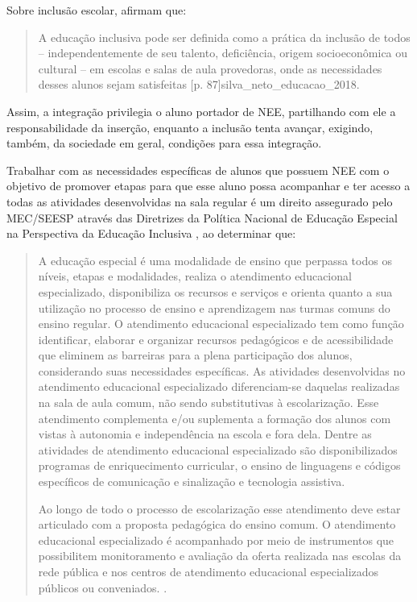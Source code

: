 \documentclass{textolivre}
\begin{document}
Sobre inclusão escolar, \textcite{stainback_inclusao_1999} afirmam que:

\begin{quote}
    A educação inclusiva pode ser definida como a prática da inclusão de todos – independentemente de seu talento, deficiência, origem socioeconômica ou cultural – em escolas e salas de aula provedoras, onde as necessidades desses alunos sejam satisfeitas [p. 87]{silva_neto_educacao_2018}.
\end{quote}

Assim, a integração privilegia o aluno portador de NEE, partilhando com ele a responsabilidade da inserção, enquanto a inclusão tenta avançar, exigindo, também, da sociedade em geral, condições para essa integração. 

Trabalhar com as necessidades específicas de alunos que possuem NEE com o objetivo de promover etapas para que esse aluno possa acompanhar e ter acesso a todas as atividades desenvolvidas na sala regular é um direito assegurado pelo MEC/SEESP através das Diretrizes da Política Nacional de Educação Especial na Perspectiva da Educação Inclusiva \cite{brasil_politica_2008}, ao determinar que:

\begin{quote}
    A educação especial é uma modalidade de ensino que perpassa todos os níveis, etapas e modalidades, realiza o atendimento educacional especializado, disponibiliza os recursos e serviços e orienta quanto a sua utilização no processo de ensino e aprendizagem nas turmas comuns do ensino regular. O atendimento educacional especializado tem como função identificar, elaborar e organizar recursos pedagógicos e de acessibilidade que eliminem as barreiras para a plena participação dos alunos, considerando suas necessidades específicas. As atividades desenvolvidas no atendimento educacional especializado diferenciam-se daquelas realizadas na sala de aula comum, não sendo substitutivas à escolarização. Esse atendimento complementa e/ou suplementa a formação dos alunos com vistas à autonomia e independência na escola e fora dela. Dentre as atividades de atendimento educacional especializado são disponibilizados programas de enriquecimento curricular, o ensino de linguagens e códigos específicos de comunicação e sinalização e tecnologia assistiva.
    
    Ao longo de todo o processo de escolarização esse atendimento deve estar articulado com a proposta pedagógica do ensino comum. O atendimento educacional especializado é acompanhado por meio de instrumentos que possibilitem monitoramento e avaliação da oferta realizada nas escolas da rede pública e nos centros de atendimento educacional especializados públicos ou conveniados. \cite[p. 9]{brasil_politica_2008}.
\end{quote}
\end{document}
